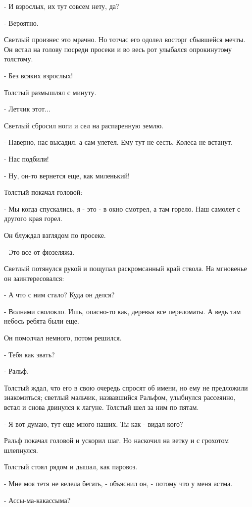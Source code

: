 \documentclass[12pt]{article}
\begin{document}
    - И взрослых, их тут совсем нету, да?

    - Вероятно.

    Светлый произнес это мрачно. Но тотчас  его  одолел  восторг  сбывшейся
мечты.   Он  встал  на  голову  посреди  просеки  и  во  весь  рот  улыбался
опрокинутому толстому.

    - Без всяких взрослых!

    Толстый размышлял с минуту.

    - Летчик этот...

    Светлый сбросил ноги и сел на распаренную землю.

    - Наверно, нас высадил, а сам улетел.  Ему  тут  не  сесть.  Колеса  не
встанут.

    - Нас подбили!

    - Ну, он-то вернется еще, как миленький!

    Толстый покачал головой:

    - Мы  когда  спускались,  я  -  это - в окно смотрел, а там горело. Наш
самолет с другого края горел.

    Он блуждал взглядом по просеке.

    - Это все от фюзеляжа.

    Светлый  потянулся  рукой  и  пощупал  раскромсанный  край  ствола.  На
мгновенье он заинтересовался:

    - А что с ним стало? Куда он делся?

    - Волнами  сволокло. Ишь, опасно-то как, деревья все переломаты. А ведь
там небось ребята были еще.

    Он помолчал немного, потом решился.

    - Тебя как звать?

    - Ральф.

    Толстый ждал, что его в свою  очередь  спросят  об  имени,  но  ему  не
предложили  знакомиться;  светлый  мальчик,  назвавшийся  Ральфом, улыбнулся
рассеянно, встал и снова двинулся к лагуне. Толстый шел за ним по пятам.

    - Я вот думаю, тут еще много наших. Ты как - видал кого?

    Ральф покачал головой и ускорил шаг. Но наскочил на ветку и с  грохотом
шлепнулся.

    Толстый стоял рядом и дышал, как паровоз.

    - Мне  моя  тетя  не  велела бегать, - объяснил он, - потому что у меня
астма.

    - Ассы-ма-какассыма?
\end{document}
